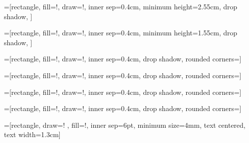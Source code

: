 \documentclass[10pt]{article} %
\begin{document}
=[rectangle,
fill=\machineColor!\fillOpacity,
draw=\machineColor!\drawOpacity,
inner sep=0.4cm,
minimum height=2.55cm,
drop shadow,
]

=[rectangle,
fill=\machineColor!\fillOpacity,
draw=\machineColor!\drawOpacity,
inner sep=0.4cm,
minimum height=1.55cm,
drop shadow,
]

=[rectangle,
fill=\processColor!\fillOpacity,
draw=\processColor!\drawOpacity,
inner sep=0.4cm,
drop shadow,
rounded corners=\processCorner]

=[rectangle,
fill=\threadColor!\fillOpacity,
draw=\threadColor!\drawOpacity,
inner sep=0.4cm,
drop shadow,
rounded corners=\threadCorner]


=[rectangle,
fill=\coreColor!\fillOpacity,
draw=\coreColor!\drawOpacity,
inner sep=0.4cm,
drop shadow,
rounded corners=\coreCorner]

=[rectangle,
fill=\chipColor!\fillOpacity,
draw=\chipColor!\drawOpacity,
inner sep=0.4cm,
drop shadow,
rounded corners=\chipCorner]

=[rectangle,
draw=\taskColor!\drawOpacity
,
fill=\taskColor!\fillOpacity,
inner sep=6pt,
minimum size=4mm,
text centered, 
text width=1.3cm]

\newcommand{\setAllX}[1]{%
  \def\xshiftA{#1}
  \def\xshiftB{#1}
  \def\xshiftC{#1}
  \def\xshiftD{#1}
  \def\xshiftE{#1}
}
  
\def\pipeSep{-15mm}
\def\xshiftC{20mm}
\def\xshiftA{2mm}
\def\xshiftE{2mm}


\def\lthistOuter{13.6mm}
\def\lfarOuter{11mm}
\def\lmidOuter{0.85cm}
\def\louter{0.65cm}
\def\lmiddle{0.4cm}
\def\linner{0.22cm}

\newcommand{\nodes}[4]{%
 \node[sTask] (#1) {\bf Task A};
 \node[sTask] (#2) [right=of #1, xshift=\xshiftB ] {\bf Task B};
 \node[sTask] (#3) [right=of #2, xshift=\xshiftC ] {\bf Task C};
 \node[sTask] (#4) [right=of #3, xshift=\xshiftD ] {\bf Task D};
}

\newcommand{\nodesX}[5]{%
 \node[sTask] (#1) [#5]{\bf Task A};
 \node[sTask] (#2) [right=of #1, xshift=\xshiftB ] {\bf Task B};
 \node[sTask] (#3) [right=of #2, xshift=\xshiftC ] {\bf Task C};
 \node[sTask] (#4) [right=of #3, xshift=\xshiftD ] {\bf Task D};
}
\end{document}
